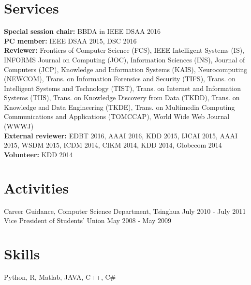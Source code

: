 \documentclass[margin, 10pt]{res} %
\begin{document}
\begin{resume}



\section{Services}

{\bf Special session chair:} BBDA in IEEE DSAA 2016 \\
{\bf PC member:} IEEE DSAA 2015, DSC 2016 \\
{\bf Reviewer:}
Frontiers of Computer Science (FCS),
IEEE Intelligent Systems (IS),
INFORMS Journal on Computing (JOC),
Information Sciences (INS),
Journal of Computers (JCP),
Knowledge and Information Systems (KAIS),
Neurocomputing (NEWCOM),
Trans. on Information Forensics and Security (TIFS),
Trans. on Intelligent Systems and Technology (TIST),
Trans. on Internet and Information Systems (TIIS),
Trans. on Knowledge Discovery from Data (TKDD),
Trans. on Knowledge and Data Engineering (TKDE),
Trans. on Multimedia Computing Communications and Applications (TOMCCAP),
World Wide Web Journal (WWWJ) \\
{\bf External reviewer:} EDBT 2016, AAAI 2016, KDD 2015, IJCAI 2015, AAAI 2015,
WSDM 2015, ICDM 2014, CIKM 2014, KDD 2014, Globecom 2014 \\
{\bf Volunteer:} KDD 2014


\section{Activities}

Career Guidance, Computer Science Department, Tsinghua \hfill {July 2010 - July 2011} \\
Vice President of Students' Union \hfill {May 2008 - May 2009}


\section{Skills}

Python, R, Matlab, JAVA, C++, C\# \\

\end{resume}
\end{document}
